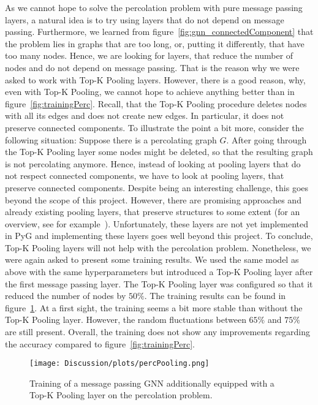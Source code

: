 As we cannot hope to solve the percolation problem with pure message passing layers, 
a natural idea is to try using layers that do not depend on message passing. 
Furthermore, we learned from figure~\ref{fig:gnn_connectedComponent} that the problem lies 
in graphs that are \glqq{}too long\grqq{}, or, putting it differently, that have too many nodes.
Hence, we are looking for layers, that reduce the number of nodes and do not depend on message passing.
That is the reason why we were asked to work with Top-K Pooling layers.
However, there is a good reason, why, even with Top-K Pooling, we cannot hope to achieve 
anything better than in figure~\ref{fig:trainingPerc}.
Recall, that the Top-K Pooling procedure deletes nodes with all its edges and does not create new edges. 
In particular, it does not preserve connected components. To illustrate the point a bit more, 
consider the following situation: Suppose there is a percolating graph $G$. 
After going through the Top-K Pooling layer some nodes might be deleted, 
so that the resulting graph is not percolating anymore. 
Hence, instead of looking at pooling layers that do not respect connected components, we have to look 
at pooling layers, that preserve connected components.
Despite being an interesting challenge, this goes beyond the scope of this project.
However, there are promising approaches and already existing pooling layers, that preserve structures to some extent (for an overview, see for example~\cite{poolingInGNNs}).
Unfortunately, these layers are not yet implemented in PyG and implementing these layers goes well beyond this project.
To conclude, Top-K Pooling layers will not help with the percolation problem. 
Nonetheless, we were again asked to present some training results. We used the same model as above 
with the same hyperparameters but introduced a Top-K Pooling layer after the first message passing layer.
The Top-K Pooling layer was configured so that it reduced the number of nodes by $50\%$.  
The training results can be found in figure~\ref{fig:resTopK}.
At a first sight, the training seems a bit more stable than without the Top-K Pooling layer. 
However, the random fluctuations between $65\%$ and $75\%$ are still present. 
Overall, the training does not show any improvements regarding the accuracy compared to figure~\ref{fig:trainingPerc}.
\begin{figure}[h]
    \centering
    \texttt{[image: Discussion/plots/percPooling.png]}
    \caption{Training of a message passing GNN additionally equipped with a Top-K Pooling layer on the percolation problem.}
    \label{fig:resTopK}
\end{figure}
 